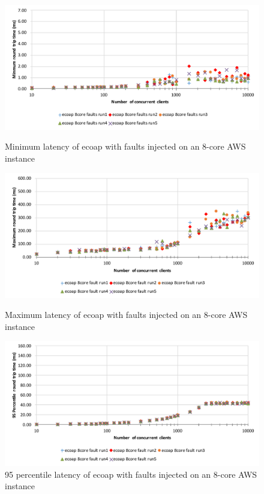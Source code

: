 \begin{figure}[!htbp]
\centering
\includegraphics[scale=0.7]{ecoap_faults_min_latency}
\caption{Minimum latency of ecoap with faults injected on an 8-core AWS instance}
\label{fig:ecoap_faults_min_latency}
\includegraphics[scale=0.7]{ecoap_faults_max_latency}
\caption{Maximum latency of ecoap with faults injected on an 8-core AWS instance}
\label{fig:ecoap_faults_max_latency}
\includegraphics[scale=0.7]{ecoap_faults_95p_latency}
\caption{95 percentile latency of ecoap with faults injected on an 8-core AWS instance}
\label{fig:ecoap_faults_95p_latency}
\end{figure}

